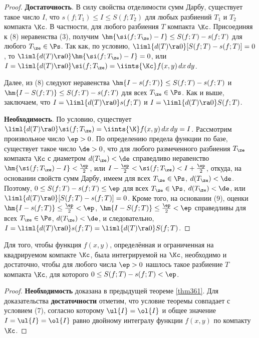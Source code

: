 \documentclass[a4paper]{article}
\begin{document}
\begin{proof}
\textbf{Достаточность}. В силу свойства отделимости сумм Дарбу,
существует такое число $I$, что $s(f;T_1)\le I\le S(f;T_2)$ для
любых разбиений $T_1$ и $T_2$ компакта $\Kc$. В частности,
 для любого разбиения $T$ компакта
$\Kc$. Присоединяя к (8) неравенства (3), получим
$\hm{\si(f;T_{\ze})-I} \le S(f;T)-s(f;T)$ для любого
$T_{\ze}\in\Ps$. Так как, по условию, $\liml{d(T)\ra0}
[S(f;T)-s(f;T)]=0$, то $\liml{d(T)\ra0}\hm{\si(f;T_{\ze})-I}=0$, или
$I=\liml{d(T)\ra0} \si(f;T_{\ze})=\iints{\Kc}f(x,y)\,dx\,dy$.

Далее, из (8) следуют неравенства $\hm{I-s(f;T)}\le S(f;T)-s(f;T)$ и
$\hm{I-S(f;T)} \le S(f;T)-s(f;T)$ для всех $T_{\ze}\in\Ps$. Как и
выше, заключаем, что $I=\liml{d(T)\ra0} s(f;T)$ и $I=\liml{d(T)\ra0}
S(f;T)$.

\textbf{Необходимость}. По условию, существует $\liml{d(T)\ra0}
\si(f;T_{\ze})=\iints{\K} f(x,y)\,dx\,dy=I$. Рассмотрим произвольное
число $\ep>0$. По определению предела функции по базе, существует
такое число $\de>0$, что для любого размеченного разбиения $T_{\ze}$
компакта $\Kc$ с диаметром $d(T_{\ze})<\de$ справедливо неравенство
$\hm{\si(f;T_{\ze})-I}<\frac{\ep}2$, или $I-\frac{\ep}2 <
\si(f;T_{\ze}) < I+\frac{\ep}2$, откуда, на основании свойств сумм
Дарбу, имеем  для всех $T_{\ze}\in\Ps$,
$d(T_{\ze})<\de$. Поэтому, $0\le S(f;T)-s(f;T)\le\ep$ для всех
$T_{\ze}\in\Ps$, $d(T_{\ze})<\de$, или $\liml{d(T)\ra0}
[S(f;T)-s(f;T)]=0$. Кроме того, на основании (9), оценки
$\hm{I-s(f;T)}\le\frac{\ep}2<\ep$, $\hm{I-S(f;T)}\le\frac{\ep}2 <
\ep$ справедливы для всех $T_{\ze}\in\Ps$, $d(T_{\ze})<\de$, и
следовательно, $I=\liml{d(T)\ra0}s(f;T)=\liml{d(T)\ra0} S(f;T)$.
\end{proof}

\begin{theorem}
\label{thm362} Для того, чтобы функция $f(x,y)$, определённая и
ограниченная на квадрируемом компакте $\Kc$, была интегрируемой на
$\Kc$, необходимо и достаточно, чтобы для любого числа $\ep>0$
нашлось такое разбиение $T$ компакта $\Kc$, для которого $0\le
S(f;T)-s(f;T)<\ep$.
\end{theorem}

\begin{proof}
\textbf{Необходимость} доказана в предыдущей теореме \ref{thm361}.
Для доказательства \textbf{достаточности} отметим, что условие
теоремы совпадает с условием (7), согласно которому $\ul{I}=\ol{I}$
и общее значение $I=\ul{I}=\ol{I}$ равно двойному интегралу функции
$f(x,y)$ по компакту $\Kc$.
\end{proof}
\end{document}
